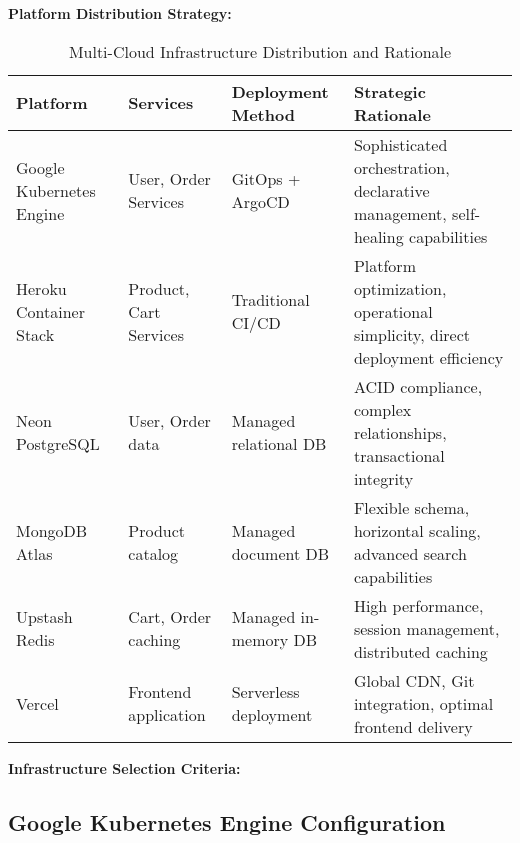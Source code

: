 \textbf{Platform Distribution Strategy:}

\begin{table}[H]
\centering
\caption{Multi-Cloud Infrastructure Distribution and Rationale}
\label{tab:infrastructure-distribution}
\begin{tabular}{|p{3cm}|p{3cm}|p{3cm}|p{5cm}|}
\hline
\textbf{Platform} & \textbf{Services} & \textbf{Deployment Method} & \textbf{Strategic Rationale} \\
\hline
Google Kubernetes Engine & User, Order Services & GitOps + ArgoCD & Sophisticated orchestration, declarative management, self-healing capabilities \\
\hline
Heroku Container Stack & Product, Cart Services & Traditional CI/CD & Platform optimization, operational simplicity, direct deployment efficiency \\
\hline
Neon PostgreSQL & User, Order data & Managed relational DB & ACID compliance, complex relationships, transactional integrity \\
\hline
MongoDB Atlas & Product catalog & Managed document DB & Flexible schema, horizontal scaling, advanced search capabilities \\
\hline
Upstash Redis & Cart, Order caching & Managed in-memory DB & High performance, session management, distributed caching \\
\hline
Vercel & Frontend application & Serverless deployment & Global CDN, Git integration, optimal frontend delivery \\
\hline
\end{tabular}
\end{table}

\textbf{Infrastructure Selection Criteria:}

\subsection{Google Kubernetes Engine Configuration}

